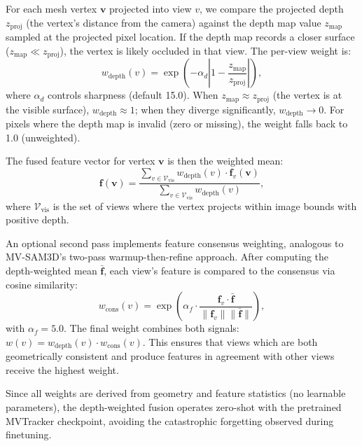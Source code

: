 \documentclass[12pt, a4paper, oneside]{report}
\begin{document}
For each mesh vertex $\mathbf{v}$ projected into view $v$, we compare the projected depth $z_{\text{proj}}$ (the vertex's distance from the camera) against the depth map value $z_{\text{map}}$ sampled at the projected pixel location. If the depth map records a closer surface ($z_{\text{map}} \ll z_{\text{proj}}$), the vertex is likely occluded in that view. The per-view weight is:
\begin{equation}
    w_{\text{depth}}(v) = \exp\!\left(-\alpha_d \left\lvert 1 - \frac{z_{\text{map}}}{z_{\text{proj}}} \right\rvert\right),
\end{equation}
where $\alpha_d$ controls sharpness (default 15.0). When $z_{\text{map}} \approx z_{\text{proj}}$ (the vertex is at the visible surface), $w_{\text{depth}} \approx 1$; when they diverge significantly, $w_{\text{depth}} \to 0$. For pixels where the depth map is invalid (zero or missing), the weight falls back to 1.0 (unweighted).

The fused feature vector for vertex $\mathbf{v}$ is then the weighted mean:
\begin{equation}
    \mathbf{f}(\mathbf{v}) = \frac{\sum_{v \in \mathcal{V}_{\text{vis}}} w_{\text{depth}}(v) \cdot \mathbf{f}_v(\mathbf{v})}{\sum_{v \in \mathcal{V}_{\text{vis}}} w_{\text{depth}}(v)},
\end{equation}
where $\mathcal{V}_{\text{vis}}$ is the set of views where the vertex projects within image bounds with positive depth.

An optional second pass implements feature consensus weighting, analogous to MV-SAM3D's two-pass warmup-then-refine approach. After computing the depth-weighted mean $\bar{\mathbf{f}}$, each view's feature is compared to the consensus via cosine similarity:
\begin{equation}
    w_{\text{cons}}(v) = \exp\!\left(\alpha_f \cdot \frac{\mathbf{f}_v \cdot \bar{\mathbf{f}}}{\lVert \mathbf{f}_v \rVert \lVert \bar{\mathbf{f}} \rVert}\right),
\end{equation}
with $\alpha_f = 5.0$. The final weight combines both signals: $w(v) = w_{\text{depth}}(v) \cdot w_{\text{cons}}(v)$. This ensures that views which are both geometrically consistent and produce features in agreement with other views receive the highest weight.

Since all weights are derived from geometry and feature statistics (no learnable parameters), the depth-weighted fusion operates zero-shot with the pretrained MVTracker checkpoint, avoiding the catastrophic forgetting observed during finetuning.
\end{document}
